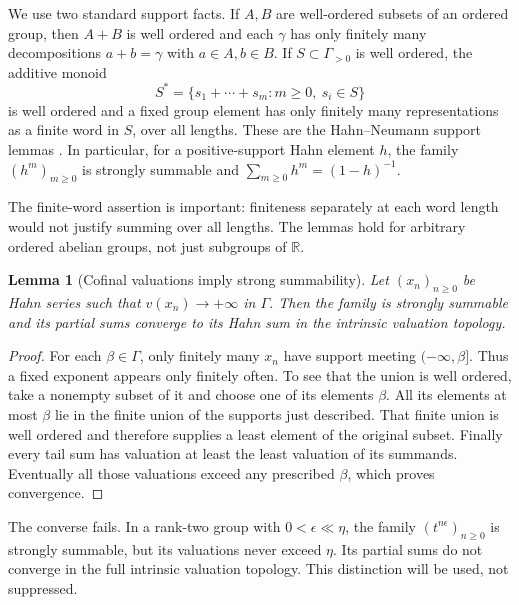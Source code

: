\documentclass[11pt,letterpaper]{article}
\numberwithin{equation}{section}
\newtheorem{lemma}[theorem]{Lemma}
\theoremstyle{definition}
\theoremstyle{remark}
\newcommand{\R}{\mathbb R}
\begin{document}
We use two standard support facts. If $A,B$ are well-ordered subsets of an
ordered group, then $A+B$ is well ordered and each $\gamma$ has only finitely
many decompositions $a+b=\gamma$ with $a\in A,b\in B$. If $S\subset\Gamma_{>0}$
is well ordered, the additive monoid
\[
 S^*=\{s_1+\cdots+s_m:m\ge0,\ s_i\in S\}
\]
is well ordered and a fixed group element has only finitely many
representations as a finite word in $S$, over all lengths. These are the
Hahn--Neumann support lemmas \cite{Neumann,Poonen}. In particular, for a
positive-support Hahn element $h$, the family $(h^m)_{m\ge0}$ is strongly
summable and $\sum_{m\ge0}h^m=(1-h)^{-1}$.

The finite-word assertion is important: finiteness separately at each word
length would not justify summing over all lengths. The lemmas hold for
arbitrary ordered abelian groups, not just subgroups of $\R$.

\begin{lemma}[Cofinal valuations imply strong summability]\label{lem:cofinal-strong}
Let $(x_n)_{n\ge0}$ be Hahn series such that $v(x_n)\to+\infty$ in $\Gamma$.
Then the family is strongly summable and its partial sums converge to its
Hahn sum in the intrinsic valuation topology.
\end{lemma}
\begin{proof}
For each $\beta\in\Gamma$, only finitely many $x_n$ have support meeting
$(-\infty,\beta]$. Thus a fixed exponent appears only finitely often. To see
that the union is well ordered, take a nonempty subset of it and choose one
of its elements $\beta$. All its elements at most $\beta$ lie in the finite
union of the supports just described. That finite union is well ordered and
therefore supplies a least element of the original subset. Finally every
tail sum has valuation at least the least valuation of its summands. Eventually
all those valuations exceed any prescribed $\beta$, which proves convergence.
\end{proof}

The converse fails. In a rank-two group with $0<\epsilon\ll\eta$, the family
$(t^{n\epsilon})_{n\ge0}$ is strongly summable, but its valuations never exceed
$\eta$. Its partial sums do not converge in the full intrinsic valuation
topology. This distinction will be used, not suppressed.
\end{document}
